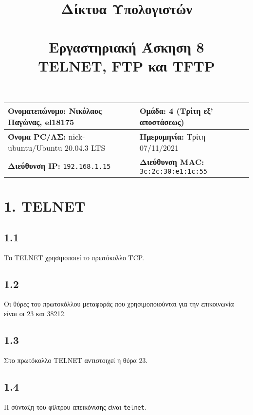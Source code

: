 

\newcommand{\imagesPath}{.}

\title{
	\textbf{Δίκτυα Υπολογιστών} \\~\\
	Εργαστηριακή Άσκηση 8 \\ 
	TELNET, FTP και TFTP
}
\author{}
\date{}


	\maketitle
	
	\begin{tabular}{|l|l|}
		\hline
		\textbf{Ονοματεπώνυμο:} Νικόλαος Παγώνας, el18175 & \textbf{Ομάδα:} 4 (Τρίτη εξ' αποστάσεως) \\
		\hline
		\textbf{Όνομα PC/ΛΣ:} nick-ubuntu/Ubuntu 20.04.3 LTS & \textbf{Ημερομηνία:} Τρίτη 07/11/2021 \\
		\hline
		\textbf{Διεύθυνση IP:} \verb|192.168.1.15| & \textbf{Διεύθυνση MAC:} \verb|3c:2c:30:e1:1c:55| \\
		\hline
	\end{tabular}

	\section*{1. TELNET}

		\subsection*{1.1}
			Το TELNET χρησιμοποιεί το πρωτόκολλο TCP.
		
		\subsection*{1.2}
			Οι θύρες του πρωτοκόλλου μεταφοράς που χρησιμοποιούνται για την επικοινωνία είναι οι 23 και 38212.
		
		\subsection*{1.3}
			Στο πρωτόκολλο TELNET αντιστοιχεί η θύρα 23.
		
		\subsection*{1.4}
			Η σύνταξη του φίλτρου απεικόνισης είναι \verb|telnet|.
		
